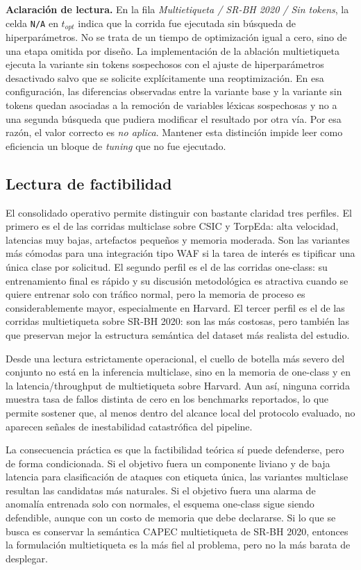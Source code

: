 \documentclass[12pt,oneside]{report}
\begin{document}
\noindent\textbf{Aclaración de lectura.} En la fila \textit{Multietiqueta / SR-BH 2020 / Sin tokens}, la celda \texttt{N/A} en $t_{opt}$ indica que la corrida fue ejecutada sin búsqueda de hiperparámetros. No se trata de un tiempo de optimización igual a cero, sino de una etapa omitida por diseño. La implementación de la ablación multietiqueta ejecuta la variante sin tokens sospechosos con el ajuste de hiperparámetros desactivado salvo que se solicite explícitamente una reoptimización. En esa configuración, las diferencias observadas entre la variante base y la variante sin tokens quedan asociadas a la remoción de variables léxicas sospechosas y no a una segunda búsqueda que pudiera modificar el resultado por otra vía. Por esa razón, el valor correcto es \textit{no aplica}. Mantener esta distinción impide leer como eficiencia un bloque de \textit{tuning} que no fue ejecutado.

\subsection{Lectura de factibilidad}
El consolidado operativo permite distinguir con bastante claridad tres perfiles. El primero es el de las corridas multiclase sobre CSIC y TorpEda: alta velocidad, latencias muy bajas, artefactos pequeños y memoria moderada. Son las variantes más cómodas para una integración tipo WAF si la tarea de interés es tipificar una única clase por solicitud. El segundo perfil es el de las corridas one-class: su entrenamiento final es rápido y su discusión metodológica es atractiva cuando se quiere entrenar solo con tráfico normal, pero la memoria de proceso es considerablemente mayor, especialmente en Harvard. El tercer perfil es el de las corridas multietiqueta sobre SR-BH 2020: son las más costosas, pero también las que preservan mejor la estructura semántica del dataset más realista del estudio.\

Desde una lectura estrictamente operacional, el cuello de botella más severo del conjunto no está en la inferencia multiclase, sino en la memoria de one-class y en la latencia/throughput de multietiqueta sobre Harvard. Aun así, ninguna corrida muestra tasa de fallos distinta de cero en los benchmarks reportados, lo que permite sostener que, al menos dentro del alcance local del protocolo evaluado, no aparecen señales de inestabilidad catastrófica del pipeline.\

La consecuencia práctica es que la factibilidad teórica sí puede defenderse, pero de forma condicionada. Si el objetivo fuera un componente liviano y de baja latencia para clasificación de ataques con etiqueta única, las variantes multiclase resultan las candidatas más naturales. Si el objetivo fuera una alarma de anomalía entrenada solo con normales, el esquema one-class sigue siendo defendible, aunque con un costo de memoria que debe declararse. Si lo que se busca es conservar la semántica CAPEC multietiqueta de SR-BH 2020, entonces la formulación multietiqueta es la más fiel al problema, pero no la más barata de desplegar.\
\end{document}
